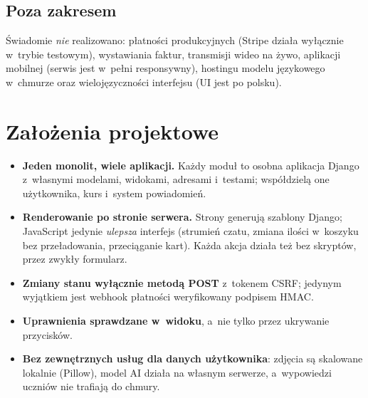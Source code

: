 \subsection*{Poza zakresem}

Świadomie \emph{nie} realizowano: płatności produkcyjnych (Stripe działa wyłącznie
w~trybie testowym), wystawiania faktur, transmisji wideo na żywo, aplikacji mobilnej
(serwis jest w~pełni responsywny), hostingu modelu językowego w~chmurze oraz
wielojęzyczności interfejsu (UI jest po polsku).

\section{Założenia projektowe}

\begin{itemize}
  \item \textbf{Jeden monolit, wiele aplikacji.} Każdy moduł to osobna aplikacja Django
        z~własnymi modelami, widokami, adresami i~testami; współdzielą one użytkownika,
        kurs i~system powiadomień.
  \item \textbf{Renderowanie po stronie serwera.} Strony generują szablony Django;
        JavaScript jedynie \emph{ulepsza} interfejs (strumień czatu, zmiana ilości w~koszyku
        bez przeładowania, przeciąganie kart). Każda akcja działa też bez skryptów, przez
        zwykły formularz.
  \item \textbf{Zmiany stanu wyłącznie metodą POST} z~tokenem CSRF; jedynym wyjątkiem jest
        webhook płatności weryfikowany podpisem HMAC.
  \item \textbf{Uprawnienia sprawdzane w~widoku}, a~nie tylko przez ukrywanie przycisków.
  \item \textbf{Bez zewnętrznych usług dla danych użytkownika}: zdjęcia są skalowane
        lokalnie (Pillow), model AI działa na własnym serwerze, a~wypowiedzi
        uczniów nie trafiają do chmury.
\end{itemize}
